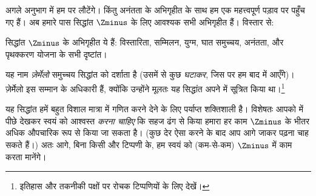 \documentclass[../../../include/open-logic-section]{subfiles}
\begin{document}

अगले अनुभाग में हम \stagesinf{} पर लौटेंगे। किंतु अनंतता के अभिगृहीत के साथ
हम एक महत्त्वपूर्ण पड़ाव पर पहुँच गए हैं। अब हमारे पास सिद्धांत $\Zminus$
के लिए आवश्यक सभी अभिगृहीत हैं। विस्तार से:

\begin{defn}
सिद्धांत $\Zminus$ के अभिगृहीत ये हैं: विस्तारिता, सम्मिलन, युग्म, घात
समुच्चय, अनंतता, और पृथक्करण योजना के सभी दृष्टांत।
\end{defn}

यह नाम \emph{ज़ेर्मेलो} समुच्चय सिद्धांत को दर्शाता है (उसमें से कुछ
\emph{घटाकर}, जिस पर हम बाद में आएँगे)। ज़ेर्मेलो इस सम्मान के अधिकारी हैं,
क्योंकि उन्होंने मूलतः यह सिद्धांत अपने
\citeyear{Zermelo1908Untersuchungen} में सूत्रित किया था।\footnote{इतिहास और
तकनीकी पक्षों पर रोचक टिप्पणियों के लिए
\citet[Appendix A]{Potter2004} देखें।}

यह सिद्धांत हमें बहुत विशाल मात्रा में गणित करने देने के लिए पर्याप्त
शक्तिशाली है। विशेषतः आपको  में पीछे देखकर स्वयं को
आश्वस्त \emph{करना चाहिए} कि सहज ढंग से किया हमारा हर काम $\Zminus$ के भीतर
अधिक औपचारिक रूप से किया जा सकता है। (कुछ देर ऐसा करने के बाद आप आगे जाकर
 पढ़ना चाह सकते हैं।) अतः आगे, बिना किसी
और टिप्पणी के, हम स्वयं को (कम-से-कम) $\Zminus$ में काम करता मानेंगे।
\end{document}
